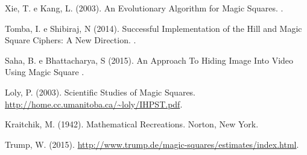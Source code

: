 \documentclass[italian,twoside,twocolumn]{article}
\begin{document}
\begin{thebibliography}{99} %

Xie, T. e Kang, L. (2003).
\newblock An Evolutionary Algorithm for Magic Squares.
.

Tomba, I. e Shibiraj, N (2014).
\newblock Successful Implementation of the Hill and Magic Square Ciphers: A New Direction.
.

Saha, B. e Bhattacharya, S (2015).
\newblock An Approach To Hiding Image Into Video  Using Magic Square
.

Loly, P. (2003).
\newblock Scientific Studies of Magic Squares.
\newblock \url{http://home.cc.umanitoba.ca/~loly/IHPST.pdf}.

Kraitchik, M. (1942).
\newblock Mathematical Recreations.
\newblock Norton, New York.

Trump, W. (2015).
\newblock \url{http://www.trump.de/magic-squares/estimates/index.html}.
 
\end{thebibliography}



\onecolumn
\end{document}
